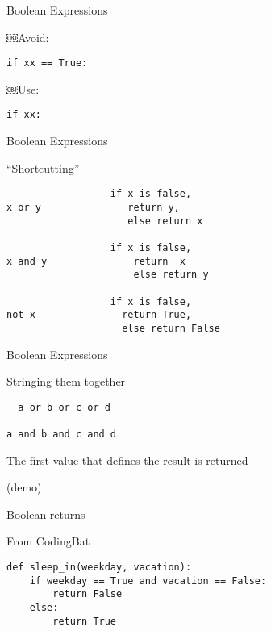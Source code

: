\documentclass{beamer}
\begin{document}
\begin{frame}[fragile]{Boolean Expressions}

{ \Large￼Avoid: }

\vspace{0.1in}
\verb+if xx == True:+

\vfill
{ \Large￼Use: }

\vspace{0.1in}
\verb+if xx:+

\vfill
\end{frame}

\begin{frame}[fragile]{Boolean Expressions}

{\Large ``Shortcutting''}

\begin{verbatim}
                  if x is false, 
x or y               return y,
                     else return x

                  if x is false,
x and y               return  x
                      else return y

                  if x is false,
not x               return True,
                    else return False 
\end{verbatim}

\end{frame} 

\begin{frame}[fragile]{Boolean Expressions}

{\Large Stringing them together}

\begin{verbatim}
￼ a or b or c or d

a and b and c and d  
\end{verbatim}

{\Large The first value that defines the result is returned}

\vfill
(demo)
\end{frame}


\begin{frame}[fragile]{Boolean returns}

{\Large From CodingBat}
\vfill
\begin{verbatim}
def sleep_in(weekday, vacation):
    if weekday == True and vacation == False:
        return False
    else:
        return True
\end{verbatim}

\end{frame}
\end{document}
